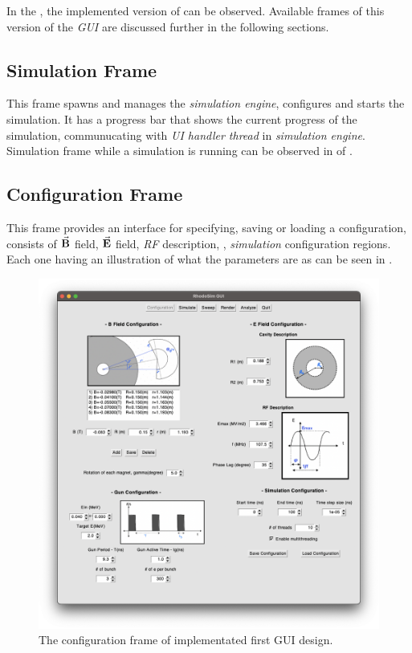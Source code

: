 \documentclass[a4paper,oneside,12pt]{report}
\numberwithin{equation}{chapter}
\begin{document}
In the , the implemented version of  can be observed. 
Available frames of this version of the \textit{GUI} are discussed further in the following sections.
\subsection{Simulation Frame}
This frame spawns and manages the \textit{simulation engine}, configures and starts the simulation. 
It has a progress bar that shows the current progress of the simulation, communucating with \textit{UI handler thread} in \textit{simulation engine}.
Simulation frame while a simulation is running can be observed in  of .
\clearpage
\subsection{Configuration Frame}
This frame provides an interface for specifying, saving or loading a configuration, consists of $\vec{\textbf{B}}$ field, $\vec{\textbf{E}}$ field, \textit{RF} description, \egun, \textit{simulation} configuration regions.
Each one having an illustration of what the parameters are as can be seen in .
\vspace{10pt}
\begin{figure}[h]
    \centering
    \includegraphics[width=\linewidth]{./figures/rhodoSim/GUI_config_frame.png}
    \caption{The configuration frame of implementated first GUI design.}
    \label{fig:gui_config}
\end{figure}
\end{document}
